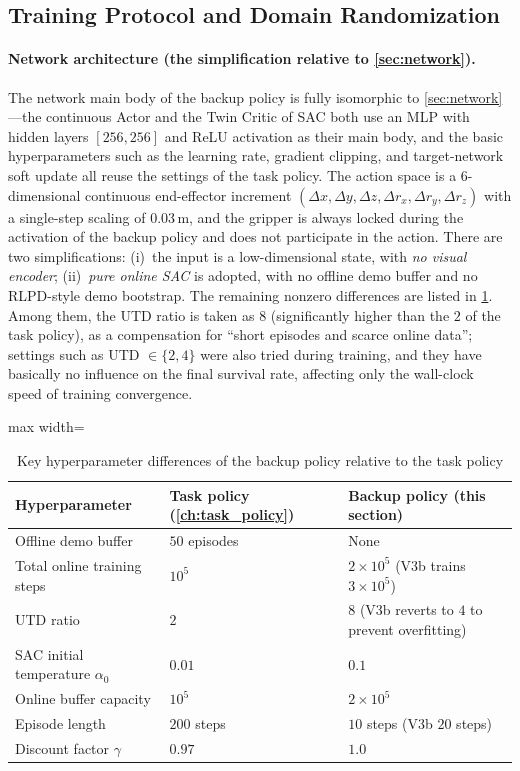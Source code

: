 \subsection{Training Protocol and Domain Randomization}\label{sec:backup_training}

\paragraph{Network architecture (the simplification relative to \cref{sec:network}).} The network main body of the backup policy is fully isomorphic to \cref{sec:network}---the continuous Actor and the Twin Critic of SAC both use an MLP with hidden layers $[256, 256]$ and ReLU activation as their main body, and the basic hyperparameters such as the learning rate, gradient clipping, and target-network soft update all reuse the settings of the task policy. The action space is a $6$-dimensional continuous end-effector increment $(\Delta x, \Delta y, \Delta z, \Delta r_x, \Delta r_y, \Delta r_z)$ with a single-step scaling of $0.03$\,m, and the gripper is always locked during the activation of the backup policy and does not participate in the action. There are two simplifications: (i)~the input is a low-dimensional state, with \emph{no visual encoder}; (ii)~\emph{pure online SAC} is adopted, with no offline demo buffer and no RLPD-style demo bootstrap. The remaining nonzero differences are listed in \cref{tab:backup_hparams}. Among them, the UTD ratio is taken as $8$ (significantly higher than the $2$ of the task policy), as a compensation for ``short episodes and scarce online data''; settings such as UTD $\in \{2, 4\}$ were also tried during training, and they have basically no influence on the final survival rate, affecting only the wall-clock speed of training convergence.

\begin{table}[htbp]
  \centering
  \caption{Key hyperparameter differences of the backup policy relative to the task policy}
  \label{tab:backup_hparams}
  \footnotesize
  \begin{adjustbox}{max width=\textwidth}
  \begin{tabular}{@{}lll@{}}
    \toprule
    Hyperparameter & Task policy (\cref{ch:task_policy}) & Backup policy (this section) \\
    \midrule
    Offline demo buffer & $50$ episodes & None \\
    Total online training steps & $10^5$ & $2 \times 10^5$ (V3b trains $3 \times 10^5$) \\
    UTD ratio & $2$ & $8$ (V3b reverts to $4$ to prevent overfitting) \\
    SAC initial temperature $\alpha_0$ & $0.01$ & $0.1$ \\
    Online buffer capacity & $10^5$ & $2 \times 10^5$ \\
    Episode length & $200$ steps & $10$ steps (V3b $20$ steps) \\
    Discount factor $\gamma$ & $0.97$ & $1.0$ \\
    \bottomrule
  \end{tabular}
  \end{adjustbox}
\end{table}


